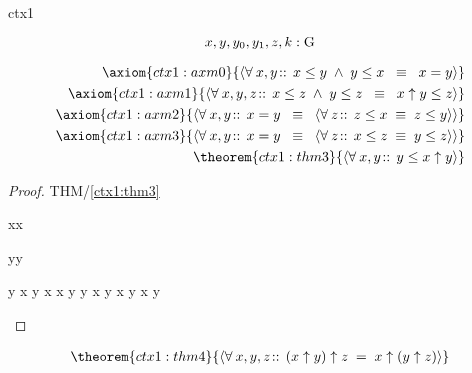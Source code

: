 \documentclass[12pt]{amsart}
\begin{document}
\begin{context}{ctx1}

\newset{\G}

\[ x,y,y_0,y_1,z,k: \text{G} \]

\precedence{[[\uparrow],[\le]]}
\begin{align}
\axiom{ctx1:axm0}{ 
	\qforall{x,y}{}{ x \le y \1\land y \le x \2\equiv x = y } } 
\\ \axiom{ctx1:axm1}{ 
	\qforall{x,y,z}{}{ x \le z \1\land y \le z \2\equiv 
		x \uparrow y \le z } }
\\ \axiom{ctx1:axm2}{ 
	\qforall{x,y}{}{ x = y \2\equiv \qforall{z}{}{ z \le x \1\equiv z \le y } } }
\\ \axiom{ctx1:axm3}{ 
	\qforall{x,y}{}{ x = y \2\equiv \qforall{z}{}{ x \le z \1\equiv y \le z } } }
\\ \theorem{ctx1:thm3}{ \qforall{x,y}{}{ y \le x \uparrow y } }
\end{align}

\begin{proof}{THM/\ref{ctx1:thm3}}
	\begin{free:var}{x}{x}
	\begin{free:var}{y}{y}
\begin{calculation}
		y \le x \uparrow y
		x \le x \uparrow y
	\2\land	y \le x \uparrow y
	\hint{=}{ \eqref{ctx1:axm1} }
		x \uparrow y \1\le x \uparrow y
	\hint{=}{ \eqref{ctx1:axm0} }
		\true
\end{calculation}
	\end{free:var}
	\end{free:var}
\end{proof}

\begin{align}
\theorem{ctx1:thm4}{ \qforall{x,y,z}{}{ (x \uparrow y) \uparrow z \1= x \uparrow (y \uparrow z) } }
\end{align}


\end{context}
\end{document}

